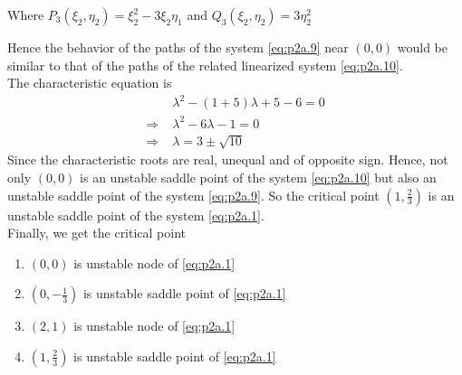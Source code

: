\documentclass[../main-sheet.tex]{subfiles}
\begin{document}
\begin{soln}[a]
\begin{enumerate}[label=(\roman*)]
        Where \(P_3(\xi_2,\eta_2)=\xi_2^2-3\xi_2\eta_1\) and \(Q_3(\xi_2,\eta_2)=3\eta_2^2\)
    \end{enumerate}
    Hence the behavior of the paths of the system \eqref{eq:p2a.9} near \((0,0)\) would be similar to that of the paths of the related linearized system \eqref{eq:p2a.10}.\\
    The characteristic equation is
    \begin{align*}
        &\lambda^2-(1+5)\lambda+5-6=0\\
        \Rightarrow\;&\lambda^2-6\lambda-1=0\\
        \Rightarrow\;&\lambda=3\pm\sqrt{10}
    \end{align*}
    Since the characteristic roots are real, unequal and of opposite sign. Hence, not only \((0,0)\) is an unstable saddle point of the system \eqref{eq:p2a.10} but also an unstable saddle point of the system \eqref{eq:p2a.9}. So the critical
    point \((1,\frac{2}{3})\) is an unstable saddle point of the system \eqref{eq:p2a.1}.\\

    Finally, we get the critical point 
    \begin{enumerate}[label=(\roman*)]
        \item \((0,0)\) is unstable node of \eqref{eq:p2a.1}
        \item \((0,-\frac{1}{3})\) is unstable saddle point of \eqref{eq:p2a.1}
        \item \((2,1)\) is unstable node of \eqref{eq:p2a.1}
        \item \((1,\frac{2}{3})\) is unstable saddle point of \eqref{eq:p2a.1}
    \end{enumerate}


\end{soln}
\end{document}
